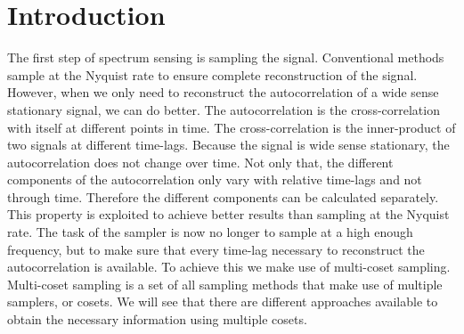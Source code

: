 \documentclass[a4paper, openany, oneside]{memoir}
\begin{document}
\section{Introduction}
The first step of spectrum sensing is sampling the signal. Conventional methods sample at the Nyquist rate to ensure complete reconstruction of the signal. However, when we only need to reconstruct the autocorrelation of a wide sense stationary signal, we can do better.  The autocorrelation is the cross-correlation with itself at different points in time. The cross-correlation is the inner-product of two signals at different time-lags. Because the signal is wide sense stationary, the autocorrelation does not change over time. Not only that, the different components of the autocorrelation only vary with relative time-lags and not through time. Therefore the different components can be calculated separately. This property is exploited to achieve better results than sampling at the Nyquist rate. The task of the sampler is now no longer to sample at a high enough frequency, but to make sure that every time-lag necessary to reconstruct the autocorrelation is available. To achieve this we make use of multi-coset sampling. Multi-coset sampling is a set of all sampling methods that make use of multiple samplers, or cosets. We will see that there are different approaches available to obtain the necessary information using multiple cosets.
\end{document}
